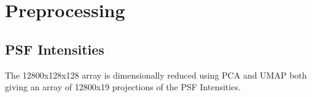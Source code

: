 \section{Preprocessing}

	\subsection{PSF Intensities}
		The 12800x128x128 array is dimensionally reduced using PCA and UMAP both giving an array of 12800x19 projections of the PSF Intensities.